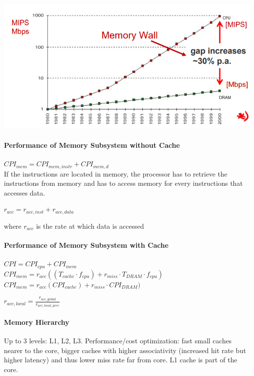 \documentclass[fontsize=8pt]{scrartcl}
\newcommand{\coloreq}[1]{\colorbox{nordicRed}{\(\displaystyle #1\)}}
\begin{document}
\begin{multicols*}{4}
\begin{center}
  \centering
  \includegraphics[width=0.8\linewidth]{img/memoryWall.png}
  \label{fig:memorywall}
\end{center}

\paragraph{Performance of Memory Subsystem without Cache} 

\coloreq{CPI_{mem} = CPI_{mem,instr} + CPI_{mem,d}} \\

\noindent
If the instructions are located in memory, the processor has to retrieve the instructions from memory and has to access memory for every instructions that accesses data.

\coloreq{r_{acc} = r_{acc,inst} + r_{acc,data}}

where $r_{acc}$ is the rate at which data is accessed


\paragraph{Performance of Memory Subsystem with Cache} 
$CPI = CPI_{cpu} + CPI_{mem}$ \\
$CPI_{mem} = r_{acc}((T_{cache} \cdot f_{cpu}) + r_{miss} \cdot T_{DRAM} \cdot f_{cpu})$ \\
\coloreq{CPI_{mem} = r_{acc}(CPI_{cache}) + r_{miss} \cdot CPI_{DRAM})}

\coloreq{r_{acc,local} = \frac{r_{acc,global}}{r_{acc, local, prev}}}

\paragraph{Memory Hierarchy} Up to 3 levels: L1, L2, L3. Performance/cost optimization: fast small caches nearer to the core, bigger caches with higher associativity (increased hit rate but higher latency) and thus lower miss rate far from core. L1 cache is part of the core.


\end{multicols*}
\end{document}
